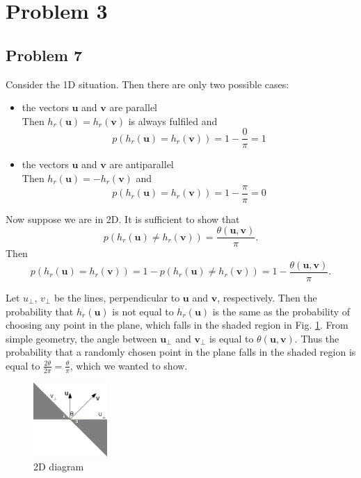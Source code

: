 \section*{Problem 3}

\subsection*{Problem 7}

Consider the 1D situation. Then there are only two possible cases:

\begin{itemize}
  \item the vectors $\mathbf{u}$ and $\mathbf{v}$ are parallel\\
Then $h_r(\mathbf{u}) = h_r(\mathbf{v})$ is always fulfiled and 
\[p(h_r(\mathbf{u}) = h_r(\mathbf{v})) = 1-\frac{0}{\pi} = 1\]
  \item the vectors $\mathbf{u}$ and $\mathbf{v}$ are antiparallel\\
Then $h_r(\mathbf{u}) = - h_r(\mathbf{v})$ and 
\[p(h_r(\mathbf{u}) = h_r(\mathbf{v})) = 1-\frac{\pi}{\pi} = 0\]
\end{itemize}

Now suppose we are in 2D. It is sufficient to show that \[p\left(h_r(\mathbf{u}) \neq h_r(\mathbf{v})\right)=\frac{\theta(\mathbf{u}, \mathbf{v})}{\pi}.\] Then \[p\left(h_r(\mathbf{u}) = h_r(\mathbf{v})\right) = 1-p\left(h_r(\mathbf{u}) \neq h_r(\mathbf{v})\right) = 1 - \frac{\theta(\mathbf{u}, \mathbf{v})}{\pi}.\]

Let $u_\perp$, $v_\perp$ be the lines, perpendicular to $\mathbf{u}$ and $\mathbf{v}$, respectively. Then the probability that $h_r(\mathbf{u})$ is not equal to $h_r(\mathbf{u})$ is the same as the probability of choosing any point in the plane, which falls in the shaded region in Fig. \ref{fig:theta}. From simple geometry, the angle between $\mathbf{u_\perp}$ and $\mathbf{v_\perp}$ is equal to $\theta(\mathbf{u,v})$. Thus the probability that a randomly chosen point in the plane falls in the shaded region is equal to $\frac{2\theta}{2\pi}=\frac{\theta}{\pi}$, which we wanted to show.
\begin{figure}[!h]
  \begin{center}
    \includegraphics[width=0.25\textwidth]{plots/3.png}
    \caption{2D diagram}
    \label{fig:theta}
  \end{center}
\end{figure}

